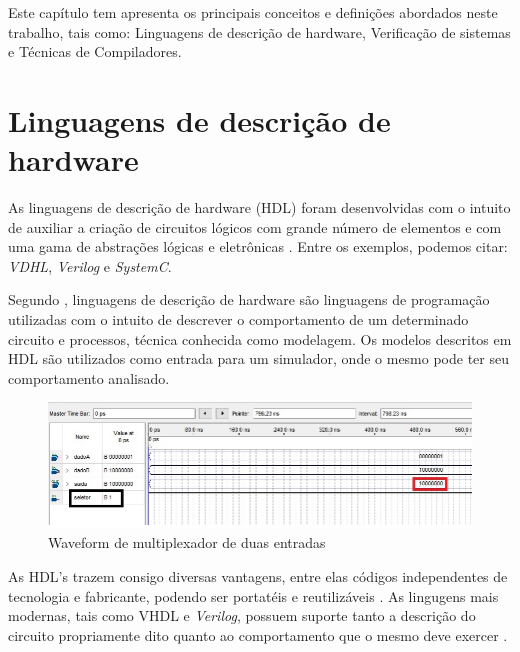 \label{chapter:conceitos}
Este capítulo tem apresenta os principais conceitos e definições abordados neste trabalho, tais como: Linguagens de descrição de hardware, Verificação de sistemas e Técnicas de Compiladores.

\section{Linguagens de descrição de hardware}

As linguagens de descrição de hardware (HDL) foram desenvolvidas com o intuito de auxiliar a criação de circuitos lógicos com grande número de elementos e com uma gama de abstrações lógicas e eletrônicas \cite{thomas2008verilog}. Entre os exemplos, podemos citar: \textit{VDHL}, \textit{Verilog} e \textit{SystemC}.

\par
Segundo \cite{christen1999vhdl}, linguagens de descrição de hardware são linguagens de programação utilizadas com o intuito de descrever o comportamento de um determinado circuito e processos, técnica conhecida como modelagem. Os modelos descritos em HDL são utilizados como entrada para um simulador, onde o mesmo pode ter seu comportamento analisado.


\begin{figure}[htb]
	\begin{center}
    \caption{\label{fig:waveform_fig}Waveform de multiplexador de duas entradas}
	\includegraphics[scale=0.55]{Figuras/Waveform_multiplex.png}
	\end{center}
\end{figure}

\par
As HDL's trazem consigo diversas vantagens, entre elas códigos independentes de tecnologia e fabricante, podendo ser portatéis e reutilizáveis \cite{cappelattipraticando}. As lingugens mais modernas, tais como VHDL e \textit{Verilog}, possuem suporte tanto a descrição do circuito propriamente dito quanto ao comportamento que o mesmo deve exercer \cite{christen1999vhdl}.

